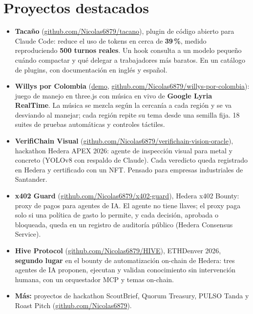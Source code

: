 \documentclass[a4paper,10pt]{article}
\newcommand{\gh}[1]{\href{https://github.com/Nicolas6879/#1}{github.com/Nicolas6879/#1}}
\begin{document}
\section*{Proyectos destacados}
\begin{itemize}
    \item \textbf{Tacaño} (\gh{tacano}), plugin de código abierto para Claude Code: reduce el
        uso de tokens en cerca de \textbf{39\,\%}, medido reproduciendo \textbf{500 turnos
        reales}. Un hook consulta a un modelo pequeño cuándo compactar y qué delegar a
        trabajadores más baratos. En un catálogo de plugins, con documentación en inglés y español.
    \item \textbf{Willys por Colombia} (\href{https://willys-por-colombia.vercel.app}{demo},
        \gh{willys-por-colombia}): juego de manejo en three.js con música en vivo de
        \textbf{Google Lyria RealTime}. La música se mezcla según la cercanía a cada región y se
        va desviando al manejar; cada región repite su tema desde una semilla fija. 18 suites de
        pruebas automáticas y controles táctiles.
    \item \textbf{VerifiChain Visual} (\gh{verifichain-vision-oracle}), hackathon Hedera APEX
        2026: agente de inspección visual para metal y concreto (YOLOv8 con respaldo de Claude).
        Cada veredicto queda registrado en Hedera y certificado con un NFT. Pensado para
        empresas industriales de Santander.
    \item \textbf{x402 Guard} (\gh{x402-guard}), Hedera x402 Bounty: proxy de pagos para agentes
        de IA. El agente no tiene llaves; el proxy paga solo si una política de gasto lo permite,
        y cada decisión, aprobada o bloqueada, queda en un registro de auditoría público (Hedera
        Consensus Service).
    \item \textbf{Hive Protocol} (\gh{HIVE}), ETHDenver 2026, \textbf{segundo lugar} en el bounty
        de automatización on-chain de Hedera: tres agentes de IA proponen, ejecutan y validan
        conocimiento sin intervención humana, con un orquestador MCP y temas on-chain.
    \item \textbf{Más:} proyectos de hackathon ScoutBrief, Quorum Treasury, PULSO Tanda y Roast
        Pitch (\href{https://github.com/Nicolas6879}{github.com/Nicolas6879}).
\end{itemize}
\end{document}
